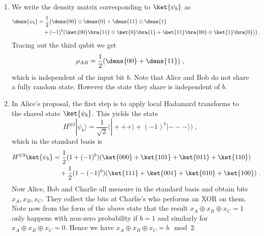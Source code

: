 \begin{exercises}
\begin{enumerate}
	\item We write the density matrix corresponding to $\ket{\psi_b}$ as
	\begin{align*}
     	\dens{\psi_b} &= \frac{1}{2}\big(\dens{00}\otimes\dens{0} + \dens{11}\otimes\dens{1}\\
     	&\quad + (-1)^{b}(\ket{00}\bra{11}\otimes\ket{0}\bra{1} + \ket{11}\bra{00}\otimes\ket{1}\bra{0})\big)\;.
   	\end{align*}
 Tracing out the third qubit we get
\[\rho_{AB} = \frac{1}{2}(\dens{00} + \dens{11})\;,\]
	which is independent of the input bit \(b\). Note that Alice and Bob do not share a fully random state. However the state they share is independent of \(b\).
	
	\item In Alice's proposal, the first step is to apply local Hadamard transforms to the shared state $\ket{\psi_b}$. This yields the state
	\[ H^{\otimes 3}|\psi_b\rangle = \frac{1}{\sqrt{2}}\big(|+++\rangle + (-1)^b|---\rangle\big)\;,\] which in the standard basis is
	\begin{align*}		
		H^{\otimes 3}\ket{\psi_b} &=\frac{1}{2}(1+(-1)^b)(\ket{000} + \ket{101}+\ket{011} + \ket{110})\\
		&\quad + \frac{1}{2}(1-(-1)^b)(\ket{111} + \ket{001} + \ket{010} + \ket{100})\;.
	\end{align*}
	Now Alice, Bob and Charlie all measure in the standard basis and obtain bits \(x_A, x_B,x_C\). They collect the bits at Charlie's who performs an XOR on them. Note now from the form of the above state that the result \(x_A\oplus x_B\oplus x_C = 1\) only happens with non-zero probability if \(b=1\) and similarly for \(x_A\oplus x_B\oplus x_C = 0\). Hence we have \(x_A\oplus x_B\oplus x_C = b \mod 2\).
\end{enumerate}
\end{exercises}